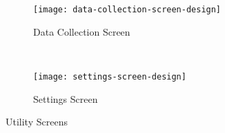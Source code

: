 \begin{figure*}[ht]
    \centering
    \begin{subfigure}[t]{0.4\textwidth}
        \centering
        \texttt{[image: data-collection-screen-design]}
        \caption{Data Collection Screen}
    \end{subfigure}%
    ~ 
    \begin{subfigure}[t]{0.4\textwidth}
        \centering
        \texttt{[image: settings-screen-design]}
        \caption{Settings Screen}
    \end{subfigure}
    \caption{Utility Screens}
\end{figure*}